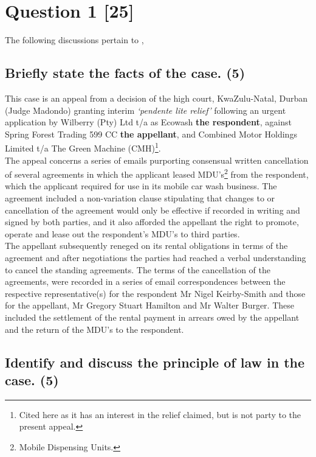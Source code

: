 \documentclass[11pt]{article}
\begin{document}

\section{Question 1 [25]}
\label{sec:org1a65305}

The following discussions pertain to 
\cite{Cachalia15_spring_forest_v_wilberry},

\subsection{Briefly state the facts of the case. (5)}
\label{sec:org1b4b8fb}

This case is an appeal from a decision of the high court, KwaZulu-Natal, Durban
(Judge Madondo) granting interim \emph{`pendente lite relief'} following an urgent
application by Wilberry (Pty) Ltd t/a as Ecowash \textbf{the respondent}, against Spring
Forest Trading 599 CC \textbf{the appellant}, and Combined Motor Holdings Limited t/a
The Green Machine (CMH)\footnote{Cited here as it has an interest in the relief
claimed, but is not party to the present appeal.}.\\

The appeal concerns a series of emails purporting consensual written
cancellation of several agreements in which the applicant leased
MDU's\footnote{Mobile Dispensing Units.} from the respondent, which the applicant
required for use in its mobile car wash business. The agreement included a
non-variation clause stipulating that changes to or cancellation of the
agreement would only be effective if recorded in writing and signed by both
parties, and it also afforded the appellant the right to promote, operate and lease out
the respondent's MDU's to third parties.\\

The appellant subsequently reneged on its rental obligations in terms of the
agreement and after negotiations the parties had reached a verbal understanding
to cancel the standing agreements. The terms of the cancellation of the
agreements, were recorded in a series of email correspondences between the
respective representative(s) for the respondent Mr Nigel Keirby-Smith and those
for the appellant, Mr Gregory Stuart Hamilton and Mr Walter Burger. These
included the settlement of the rental payment in arrears owed by the appellant
and the return of the MDU's to the respondent.

\subsection{Identify and discuss the principle of law in the case. (5)}
\label{sec:org6f73a0b}
\end{document}
